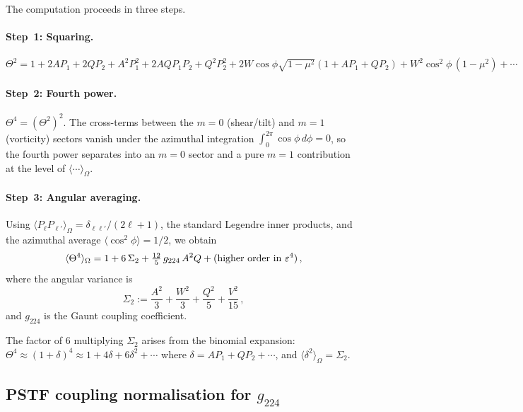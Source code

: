 The computation proceeds in three steps.

\paragraph{Step~1: Squaring.}
$\Theta^2 = 1 + 2A P_1 + 2Q P_2 + A^2 P_1^2 + 2AQ P_1 P_2
+ Q^2 P_2^2 + 2W\cos\phi\sqrt{1-\mu^2}(1 + AP_1 + QP_2)
+ W^2\cos^2\!\phi\,(1-\mu^2) + \cdots$

\paragraph{Step~2: Fourth power.}
$\Theta^4 = (\Theta^2)^2$.  The cross-terms between the
$m = 0$ (shear/tilt) and $m = 1$ (vorticity) sectors vanish
under the azimuthal integration
$\int_0^{2\pi}\cos\phi\,d\phi = 0$, so the fourth power
separates into an $m = 0$ sector and a pure $m = 1$ contribution
at the level of $\langle\cdots\rangle_\Omega$.

\paragraph{Step~3: Angular averaging.}
Using $\langle P_\ell P_{\ell'}\rangle_\Omega
= \delta_{\ell\ell'}/(2\ell+1)$, the standard Legendre
inner products, and the azimuthal average
$\langle\cos^2\!\phi\rangle = 1/2$, we obtain
\begin{equation}\label{eq:F4-full}
\langle\Theta^4\rangle_\Omega
= 1 + 6\,\Sigma_2 + \tfrac{12}{5}\,g_{224}\,A^2 Q
  + \text{(higher order in $\varepsilon^4$)}\,,
\end{equation}
where the angular variance is
\begin{equation}\label{eq:Sigma2-def}
\Sigma_2 := \frac{A^2}{3} + \frac{W^2}{3}
  + \frac{Q^2}{5} + \frac{V^2}{15}\,,
\end{equation}
and $g_{224}$ is the Gaunt coupling coefficient.

The factor of $6$ multiplying $\Sigma_2$ arises from the
binomial expansion: $\Theta^4 \approx (1 + \delta)^4
\approx 1 + 4\delta + 6\delta^2 + \cdots$ where
$\delta = AP_1 + QP_2 + \cdots$, and
$\langle\delta^2\rangle_\Omega = \Sigma_2$.


\subsection{PSTF coupling normalisation for $g_{224}$}
\label{sec:gaunt}

